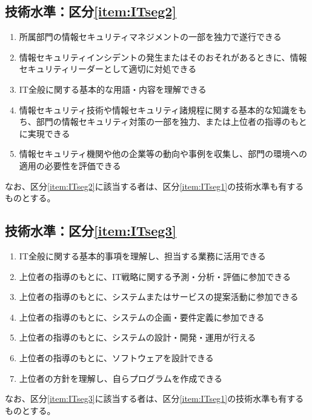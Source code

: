 \subsection{技術水準：区分\ref{item:ITseg2}}
\begin{enumerate}[label=\sarrow]
\item 所属部門の情報セキュリティマネジメントの一部を独力で遂行できる
\item {}情報セキュリティインシデントの発生またはそのおそれがあるときに、情報セキュリティリーダーとして適切に対処できる
\item IT全般に関する基本的な用語・内容を理解できる
\item 情報セキュリティ技術や情報セキュリティ諸規程に関する基本的な知識をもち、部門の情報セキュリティ対策の一部を独力、または上位者の指導のもとに実現できる
\item 情報セキュリティ機関や他の企業等の動向や事例を収集し、部門の環境への適用の必要性を評価できる
\end{enumerate}
なお、区分\ref{item:ITseg2}\hx に該当する者は、区分\ref{item:ITseg1}\hx の技術水準も有するものとする。

\subsection{技術水準：区分\ref{item:ITseg3}}
\begin{enumerate}[label=\sarrow]
\item IT全般に関する基本的事項を理解し、担当する業務に活用できる
\item 上位者の指導のもとに、IT戦略に関する予測・分析・評価に参加できる
\item 上位者の指導のもとに、システムまたはサービスの提案活動に参加できる
\item 上位者の指導のもとに、システムの企画・要件定義に参加できる
\item 上位者の指導のもとに、システムの設計・開発・運用が行える
\item 上位者の指導のもとに、ソフトウェアを設計できる
\item 上位者の方針を理解し、自らプログラムを作成できる
\end{enumerate}
なお、区分\ref{item:ITseg3}\hx に該当する者は、区分\ref{item:ITseg1}\hx の技術水準も有するものとする。

